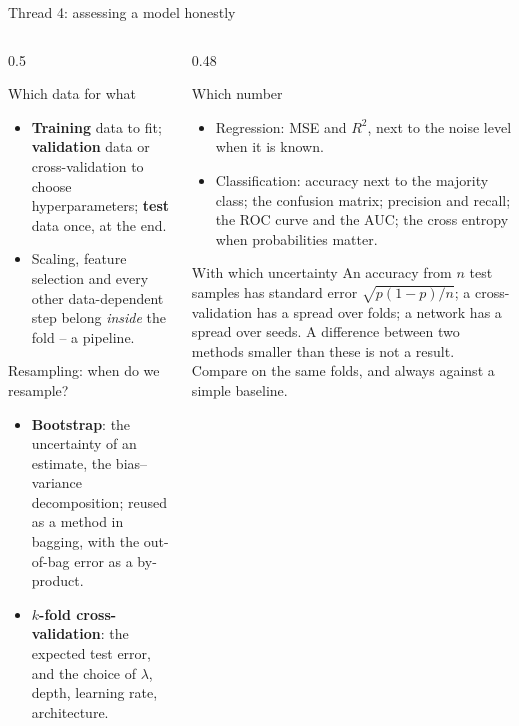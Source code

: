 \documentclass[10pt,aspectratio=169]{beamer}
\begin{document}
\begin{frame}{Thread 4: assessing a model honestly}
\begin{columns}[T]
\begin{column}{0.5\textwidth}
\small
\begin{block}{Which data for what}
\footnotesize
\begin{itemize}
  \item \textbf{Training} data to fit; \textbf{validation} data or
    cross-validation to choose hyperparameters; \textbf{test} data once,
    at the end.
  \item Scaling, feature selection and every other data-dependent step
    belong \emph{inside} the fold -- a pipeline.
\end{itemize}
\end{block}
\begin{block}{Resampling: when do we resample?}
\footnotesize
\begin{itemize}
  \item \textbf{Bootstrap}: the uncertainty of an estimate, the
    bias--variance decomposition; reused as a method in bagging, with the
    out-of-bag error as a by-product.
  \item \textbf{$k$-fold cross-validation}: the expected test error, and
    the choice of $\lambda$, depth, learning rate, architecture.
\end{itemize}
\end{block}
\end{column}
\begin{column}{0.48\textwidth}
\small
\begin{block}{Which number}
\footnotesize
\begin{itemize}
  \item Regression: MSE and $R^2$, next to the noise level when it is
    known.
  \item Classification: accuracy next to the majority class; the confusion
    matrix; precision and recall; the ROC curve and the AUC; the cross
    entropy when probabilities matter.
\end{itemize}
\end{block}
\begin{block}{With which uncertainty}
\footnotesize
An accuracy from $n$ test samples has standard error $\sqrt{p(1-p)/n}$; a
cross-validation has a spread over folds; a network has a spread over
seeds.  A difference between two methods smaller than these is not a
result.  Compare on the same folds, and always against a simple baseline.
\end{block}
\end{column}
\end{columns}
\end{frame}
\end{document}
